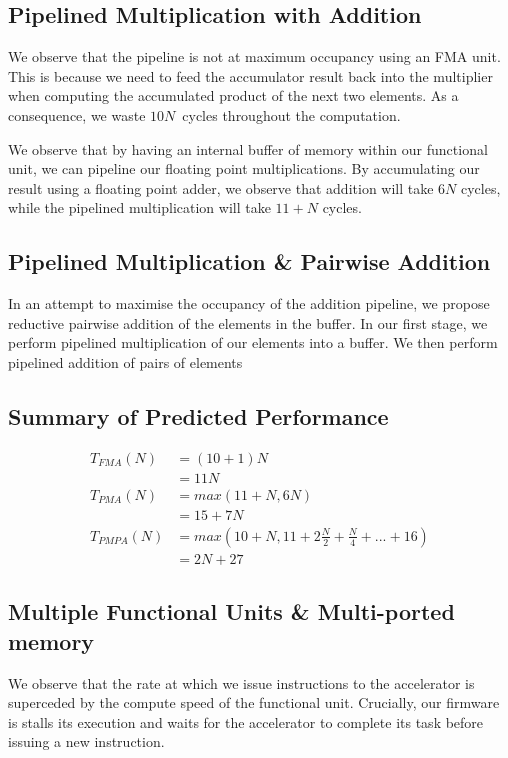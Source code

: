 \documentclass[a4paper,8pt]{report}
\begin{document}
\subsection{Pipelined Multiplication with Addition}
We observe that the pipeline is not at maximum occupancy using an FMA unit. This
is because we need to feed the accumulator result back into the multiplier when
computing the accumulated product of the next two elements. As a consequence, we
waste $10N$~cycles throughout the computation.

We observe that by having an internal buffer of memory within our functional
unit, we can pipeline our floating point multiplications. By accumulating our
result using a floating point adder, we observe that addition will take $6N$
cycles, while the pipelined multiplication will take $11+N$ cycles.


\subsection{Pipelined Multiplication \& Pairwise Addition}
In an attempt to maximise the occupancy of the addition pipeline, we propose
reductive pairwise addition of the elements in the buffer. In our first stage,
we perform pipelined multiplication of our elements into a buffer. We then
perform pipelined addition of pairs of elements 



\subsection{Summary of Predicted Performance}

\begin{align*}
  T_{FMA}(N) &= (10+1)N \\
             &= 11N \\
  T_{PMA}(N) &= max(11+N, 6N) \\
               &= 15 + 7N \\
  T_{PMPA}(N) &= max(10+N, 11+2\frac{N}{2} + \frac{N}{4} + ... + 16) \\
               &= 2N+27 
\end{align*}



\subsection{Multiple Functional Units \& Multi-ported memory}
We observe that the rate at which we issue instructions to the accelerator is
superceded by the compute speed of the functional unit. Crucially, our firmware
is stalls its execution and waits for the accelerator to complete its task
before issuing a new instruction.
\end{document}
